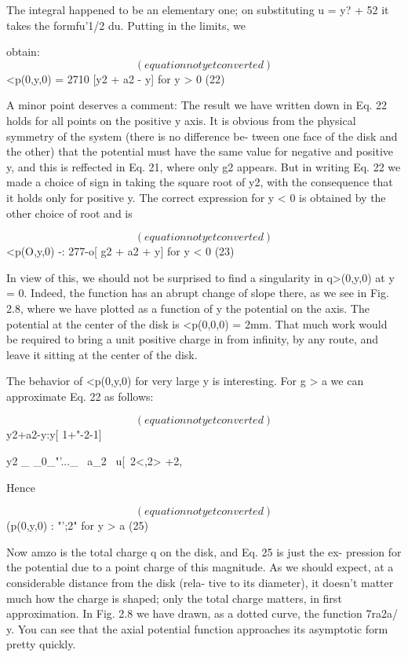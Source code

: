 The integral happened to be an elementary one; on substituting
u = y? + 52 it takes the formfu'1/2 du. Putting in the limits, we

obtain:
\begin{equation}
(equation not yet converted)
\end{equation}
<p(0,y,0) = 2710 [\/y2 + a2 - y] for y > 0 (22)

A minor point deserves a comment: The result we have written
down in Eq. 22 holds for all points on the positive y axis. It is obvious
from the physical symmetry of the system (there is no difference be-
tween one face of the disk and the other) that the potential must have
the same value for negative and positive y, and this is reffected in
Eq. 21, where only g2 appears. But in writing Eq. 22 we made a
choice of sign in taking the square root of y2, with the consequence
that it holds only for positive y. The correct expression for y < 0 is
obtained by the other choice of root and is

\begin{equation}
(equation not yet converted)
\end{equation}
<p(O,y,0) -: 277-o[ \/g2 + a2 + y] for y < 0 (23)

In view of this, we should not be surprised to find a singularity in
q>(0,y,0) at y = 0. Indeed, the function has an abrupt change of
slope there, as we see in Fig. 2.8, where we have plotted as a function
of y the potential on the axis. The potential at the center of the disk
is <p(0,0,0) = 2mm. That much work would be required to bring a
unit positive charge in from infinity, by any route, and leave it sitting
at the center of the disk.

The behavior of <p(0,y,0) for very large y is interesting. For g > a
we can approximate Eq. 22 as follows:

\begin{equation}
(equation not yet converted)
\end{equation}
\/y2+a2-y:y[ 1+"-2-1]

y2
_ _0_"'..._ ~a_2
~u[~2<,2> +2, 

Hence

\begin{equation}
(equation not yet converted)
\end{equation}
(p(0,y,0) : "';2" for y > a (25)

Now amzo is the total charge q on the disk, and Eq. 25 is just the ex-
pression for the potential due to a point charge of this magnitude.
As we should expect, at a considerable distance from the disk (rela-
tive to its diameter), it doesn't matter much how the charge is shaped;
only the total charge matters, in first approximation. In Fig. 2.8 we
have drawn, as a dotted curve, the function 7ra2a/ y. You can see that
the axial potential function approaches its asymptotic form pretty
quickly.

